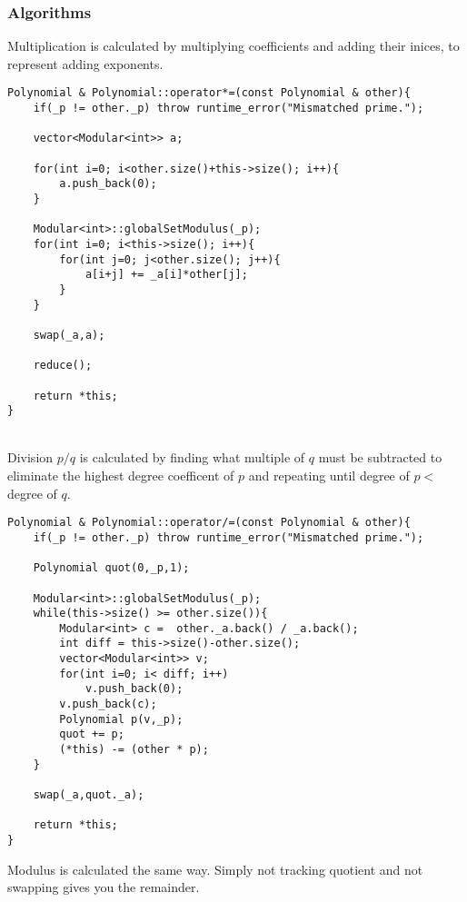 \documentclass{article}
\begin{document}
\subsubsection{Algorithms}
Multiplication is calculated by multiplying coefficients and adding their inices, to represent adding exponents.
\begin{adjustwidth}{1.5em}{1.5em}
\begin{lstlisting}
Polynomial & Polynomial::operator*=(const Polynomial & other){
    if(_p != other._p) throw runtime_error("Mismatched prime.");
    
    vector<Modular<int>> a;
    
    for(int i=0; i<other.size()+this->size(); i++){
        a.push_back(0);
    }
    
    Modular<int>::globalSetModulus(_p);
    for(int i=0; i<this->size(); i++){
        for(int j=0; j<other.size(); j++){
            a[i+j] += _a[i]*other[j];
        }
    }
    
    swap(_a,a);
    
    reduce();
    
    return *this;
}
\end{lstlisting}
\end{adjustwidth}
\hfill\\
Division $p / q$ is calculated by finding what multiple of $q$ must be subtracted to eliminate the highest degree coefficent of $p$ and repeating until degree of $p<$ degree of $q$.
\begin{adjustwidth}{1.5em}{1.5em}
\begin{lstlisting}
Polynomial & Polynomial::operator/=(const Polynomial & other){
    if(_p != other._p) throw runtime_error("Mismatched prime.");
    
    Polynomial quot(0,_p,1);
    
    Modular<int>::globalSetModulus(_p);
    while(this->size() >= other.size()){
        Modular<int> c =  other._a.back() / _a.back();
        int diff = this->size()-other.size();
        vector<Modular<int>> v;
        for(int i=0; i< diff; i++)
            v.push_back(0);
        v.push_back(c);
        Polynomial p(v,_p);
        quot += p;
        (*this) -= (other * p);
    }
    
    swap(_a,quot._a);
    
    return *this;
}
\end{lstlisting}
\end{adjustwidth}
Modulus is calculated the same way.  Simply not tracking quotient and not swapping gives you the remainder.
\end{document}
